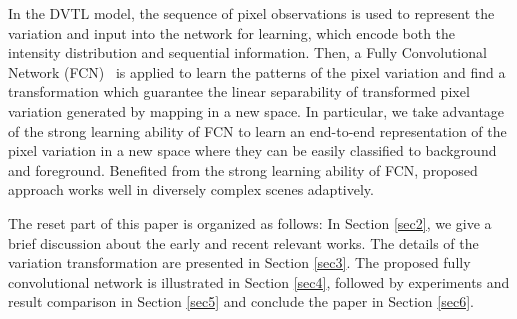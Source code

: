 \documentclass[journal]{IEEEtran}
\newcommand{\refsec}[1]{Section \ref{#1}}
\begin{document}
In the DVTL model, 
the sequence of pixel observations is used to represent the variation and input into the network for learning,
which encode both the intensity distribution and sequential information.
%
Then, a Fully Convolutional Network (FCN)\ \cite{Shelhamer2017fcn} is applied to learn the patterns of the pixel variation and find a transformation which guarantee the linear separability of transformed pixel variation generated by mapping in a new space.
%
In particular,
we take advantage of the strong learning ability of FCN to learn an end-to-end representation of the pixel variation in a new space where they can be easily classified to background and foreground.
%
Benefited from the strong learning ability of FCN,
proposed approach works well in diversely complex scenes adaptively.
%
% 
% 
% 
% 

The reset part of this paper is organized as follows: In \refsec{sec2}, we give a brief discussion about the early and recent relevant works. 
%
The details of the variation transformation are presented in \refsec{sec3}. The proposed fully convolutional network is illustrated in \refsec{sec4}, followed by experiments and result comparison in \refsec{sec5} and conclude the paper in \refsec{sec6}. 
\end{document}
